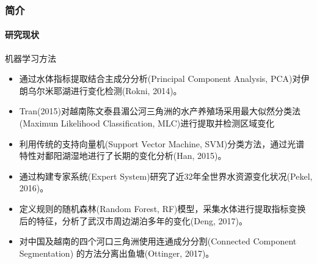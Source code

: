\documentclass[10pt]{beamer}
\begin{document}
%
\begin{frame}
\frametitle{简介}
\framesubtitle{研究现状}
\begin{block}{机器学习方法}
	\begin{itemize}
	\small
	\item 通过水体指标提取结合主成分分析(Principal Component Analysis, PCA)对伊朗乌尔米耶湖进行变化检测(Rokni, 2014)。
	\item \alert{Tran(2015)对越南陈文泰县湄公河三角洲的水产养殖场采用最大似然分类法(Maximun Likelihood Classification, MLC)进行提取并检测区域变化}
	\item 利用传统的支持向量机(Support Vector Machine, SVM)分类方法，通过光谱特性对鄱阳湖湿地进行了长期的变化分析(Han, 2015)。
	\item 通过构建专家系统(Expert System)研究了近32年全世界水资源变化状况(Pekel, 2016)。
	\item 定义规则的随机森林(Random Forest, RF)模型，采集水体进行提取指标变换后的特征，分析了武汉市周边湖泊多年的变化(Deng, 2017)。
	\item \alert{对中国及越南的四个河口三角洲使用连通成分分割(Connected Component Segmentation) 的方法分离出鱼塘(Ottinger, 2017)。}
	\end{itemize}
\end{block}
\end{frame}
\end{document}
